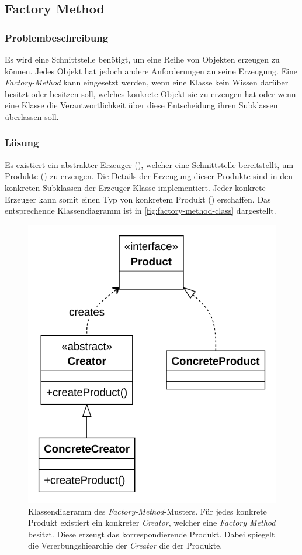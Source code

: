 \subsection{Factory Method}

\subsubsection*{Problembeschreibung}

Es wird eine Schnittstelle benötigt, um eine Reihe von Objekten erzeugen zu können. Jedes Objekt hat jedoch andere Anforderungen an seine Erzeugung. Eine \emph{Factory-Method} kann eingesetzt werden, wenn eine Klasse kein Wissen darüber besitzt oder besitzen soll, welches konkrete Objekt sie zu erzeugen hat oder wenn eine Klasse die Verantwortlichkeit über diese Entscheidung ihren Subklassen überlassen soll. \cite{gamma_design_1995}

\subsubsection*{Lösung}

Es existiert ein abstrakter Erzeuger (), welcher eine Schnittstelle bereitstellt, um Produkte () zu erzeugen. Die Details der Erzeugung dieser Produkte sind in den konkreten Subklassen der Erzeuger-Klasse implementiert. Jeder konkrete Erzeuger kann somit einen Typ von konkretem Produkt () erschaffen. Das entsprechende Klassendiagramm ist in \autoref{fig:factory-method-class} dargestellt.

\begin{figure}[!ht]
	\centering
	\includegraphics[width=0.75\linewidth]{images/patterns/factory-method-class.pdf}
	\caption{Klassendiagramm des \emph{Factory-Method}-Musters. Für jedes konkrete Produkt existiert ein konkreter \emph{Creator}, welcher eine \emph{Factory Method}  besitzt. Diese erzeugt das korrespondierende Produkt. Dabei spiegelt die Vererbungshiearchie der \emph{Creator} die der Produkte. \cite{skobeleva_factory_2023}}
	\label{fig:factory-method-class}
\end{figure}

